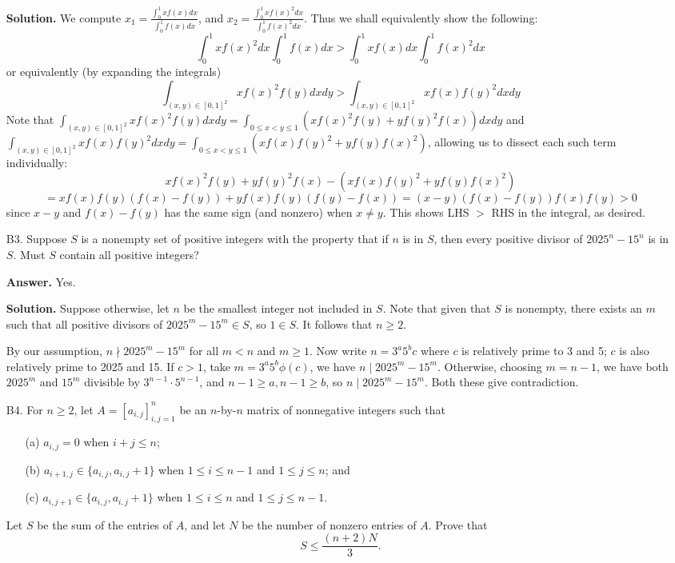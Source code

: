 \documentclass[11pt,a4paper]{article}
\begin{document}
\begin{enumerate}
        \textbf{Solution.} 
        We compute $x_1 = \frac{\int_0^1 xf(x)dx}{\int_0^1 f(x)dx}$, and $x_2=\frac{\int_0^1 xf(x)^2dx}{\int_0^1 f(x)^2dx}$. Thus we shall equivalently show the following: 
        \[
        \int_0^1 xf(x)^2dx\int_0^1 f(x)dx > \int_0^1 xf(x)dx\int_0^1 f(x)^2dx
        \]
        or equivalently (by expanding the integrals)
        \[
        \int_{(x, y)\in [0, 1]^2} xf(x)^2f(y)dxdy > \int_{(x, y)\in [0, 1]^2} xf(x)f(y)^2dxdy 
        \]
        Note that $\int_{(x, y)\in [0, 1]^2} xf(x)^2f(y)dxdy = \int_{0\le x < y\le 1} (xf(x)^2f(y) + yf(y)^2f(x))dxdy$ and 
        $\int_{(x, y)\in [0, 1]^2} xf(x)f(y)^2dxdy = \int_{0\le x < y\le 1}  (xf(x)f(y)^2 + yf(y)f(x)^2)$, 
        allowing us to dissect each such term individually: 
        \[
        xf(x)^2f(y) + yf(y)^2f(x) - (xf(x)f(y)^2 + yf(y)f(x)^2)
        \]\[
        =xf(x)f(y)(f(x)-f(y)) + yf(x)f(y)(f(y)-f(x))
        =(x-y)(f(x)-f(y))f(x)f(y) > 0
        \]
        since $x-y$ and $f(x)-f(y)$ has the same sign (and nonzero) when $x\neq y$. 
        This shows LHS $>$ RHS in the integral, as desired. 
        
        \item [B3.]
        Suppose $S$ is a nonempty set of positive integers with the property that if $n$ is in $S$, then every positive divisor of $2025^n-15^n$ is in $S$. Must $S$ contain all positive integers?
        
        \textbf{Answer.} Yes. 
        
        \textbf{Solution.} Suppose otherwise, let $n$ be the smallest integer not included in $S$. 
        Note that given that $S$ is nonempty, there exists an $m$ such that all positive divisors of $2025^m-15^m\in S$, so $1\in S$. It follows that $n\ge 2$. 
        
        By our assumption, $n\nmid 2025^m - 15^m$ for all $m < n$ and $m\ge 1$. 
        Now write $n=3^a5^b c$ where $c$ is relatively prime to 3 and 5; $c$ is also relatively prime to 2025 and 15. 
        If $c > 1$, take $m=3^a5^b\phi(c)$, we have $n\mid 2025^m - 15^m$. 
        Otherwise, choosing $m=n-1$, we have both $2025^m$ and $15^m$ divisible by $3^{n-1}\cdot 5^{n-1}$, and $n-1\ge a, n-1\ge b$, so $n\mid 2025^m - 15^m$. 
        Both these give contradiction. 
        
        \item [B4.]
        For $n \geq 2$, let $A = [a_{i,j}]_{i,j=1}^n$ be an $n$-by-$n$ matrix of nonnegative integers such that
        \begin{enumerate}
        	\item [(a)] $a_{i,j} = 0$ when $i+j\leq n$;
        	\item [(b)] $a_{i+1,j} \in \{a_{i,j}, a_{i,j}+1\}$ when $1 \leq i \leq n-1$ and $1 \leq j \leq n$; and
        	\item [(c)] $a_{i,j+1} \in \{a_{i,j}, a_{i,j}+1\}$ when $1 \leq i \leq n$ and $1 \leq j \leq n-1$.
        \end{enumerate}
        Let $S$ be the sum of the entries of $A$, and let $N$ be the number of nonzero entries of $A$. Prove that
        \[S \leq \frac{(n+2)N}{3}.\]
        

\end{enumerate}
\end{document}
